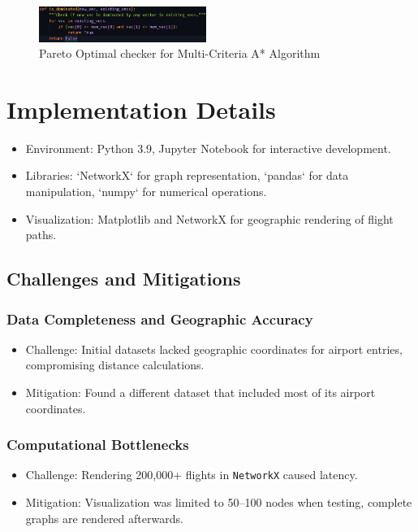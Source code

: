 \documentclass[conference]{IEEEtran}
\begin{document}
\begin{figure}[htbp]
    \centering
    \includegraphics[width=0.486\textwidth]{domination.png} %
    \caption{Pareto Optimal checker for Multi-Criteria A* Algorithm}
    \label{fig:my_image}
\end{figure}


\section{Implementation Details}
\begin {itemize}
    \item Environment: Python 3.9, Jupyter Notebook for interactive development.  
    \item Libraries: `NetworkX` for graph representation, `pandas` for data manipulation, `numpy` for numerical operations.  
    \item Visualization: Matplotlib and NetworkX for geographic rendering of flight paths.
\end{itemize}  


\subsection{Challenges and Mitigations}

\subsubsection{Data Completeness and Geographic Accuracy}
\begin{itemize}
    \item Challenge: Initial datasets lacked geographic coordinates for airport entries, compromising distance calculations.
    \item Mitigation: Found a different dataset that included most of its airport coordinates.
\end{itemize}

\subsubsection{Computational Bottlenecks}
\begin{itemize}
    \item Challenge: Rendering 200,000+ flights in \texttt{NetworkX} caused latency. 
    \item Mitigation: Visualization was limited to 50--100 nodes when testing, complete graphs are rendered afterwards.
\end{itemize}
\end{document}
